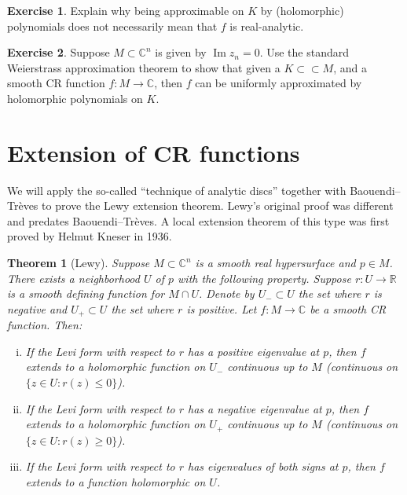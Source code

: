\documentclass[12pt,openany]{book}
\renewcommand{\Im}{\operatorname{Im}}
\newcommand{\C}{{\mathbb{C}}}
\newcommand{\R}{{\mathbb{R}}}
\theoremstyle{plain}
\newtheorem{thm}{Theorem}[section]
\theoremstyle{remark}
\theoremstyle{definition}
\newenvironment{exbox}{%
    \def\FrameCommand{\vrule width 1pt \relax\hspace{10pt}}%
    \MakeFramed{\advance\hsize-\width\FrameRestore}%
}{%
    \endMakeFramed
}
\theoremstyle{exercise}
\newtheorem{exercise}{Exercise}[section]
\theoremstyle{example}
\begin{document}
\begin{exbox}
\begin{exercise}
Explain why being approximable on $K$ by (holomorphic) polynomials does not
necessarily mean that
$f$ is real-analytic.
\end{exercise}

\begin{exercise}
Suppose $M \subset \C^n$ is given by $\Im z_n = 0$.  Use the standard
Weierstrass approximation theorem to show that given a $K \subset \subset M$,
and a smooth CR function $f \colon M \to \C$, then $f$ can be uniformly approximated
by holomorphic polynomials on $K$.
\end{exercise}
\end{exbox}


\section{Extension of CR functions}

We will apply the so-called ``technique of analytic discs'' together
with
Baouendi--Tr{\`e}ves to prove the
Lewy extension theorem.  Lewy's original proof was different
and predates Baouendi--Tr{\`e}ves.  A local extension theorem of this type
was first proved by Helmut Kneser in 1936.

\begin{thm}[Lewy]%
Suppose $M \subset \C^n$ is a smooth real hypersurface and $p \in M$.
There exists a neighborhood $U$ of $p$ with the following
property.
Suppose $r \colon U \to \R$ is
a smooth defining function for $M \cap U$.
Denote by $U_- \subset U$ the set where $r$
is negative and $U_+ \subset U$ the set where $r$ is positive.
Let $f \colon M \to \C$ be a smooth CR function.
Then:

\begin{enumerate}[(i)]
\item
If the Levi form with respect to $r$ has a positive eigenvalue at $p$, then
$f$ extends to a holomorphic function on $U_-$ continuous up to $M$
(continuous on $\{ z \in U : r(z) \leq 0 \}$).
\item
If the Levi form with respect to $r$ has a negative eigenvalue at $p$, then
$f$ extends to a holomorphic function on $U_+$ continuous up to $M$
(continuous on $\{ z \in U : r(z) \geq 0 \}$).
\item
If the Levi form with respect to $r$ has eigenvalues of both signs at $p$, then
$f$ extends to a function holomorphic on $U$.
\end{enumerate}
\end{thm}
\end{document}
